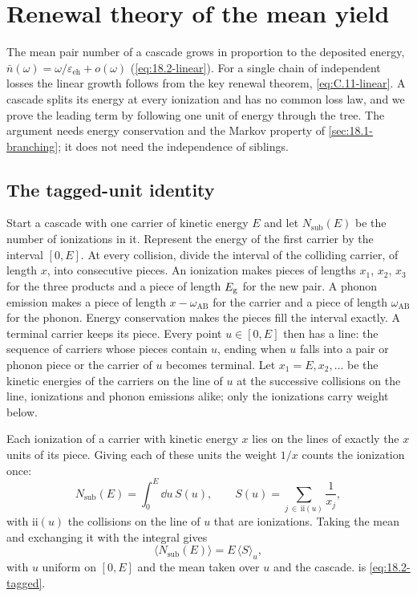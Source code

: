 \section{Renewal theory of the mean yield}\label{app:D.44}

The mean pair number of a cascade grows in proportion to the deposited energy, $\bar n(\omega) = \omega/\varepsilon_{\mathrm{eh}} + o(\omega)$ (\cref{eq:18.2-linear}). For a single chain of independent losses the linear growth follows from the key renewal theorem, \cref{eq:C.11-linear}. A cascade splits its energy at every ionization and has no common loss law, and we prove the leading term by following one unit of energy through the tree. The argument needs energy conservation and the Markov property of \cref{sec:18.1-branching}; it does not need the independence of siblings.

\subsection{The tagged-unit identity}

Start a cascade with one carrier of kinetic energy $E$ and let $N_{\mathrm{sub}}(E)$ be the number of ionizations in it. Represent the energy of the first carrier by the interval $[0, E]$. At every collision, divide the interval of the colliding carrier, of length $x$, into consecutive pieces. An ionization makes pieces of lengths $x_1$, $x_2$, $x_3$ for the three products and a piece of length $E_{\mathrm{g}}$ for the new pair. A phonon emission makes a piece of length $x - \omega_{\mathrm{AB}}$ for the carrier and a piece of length $\omega_{\mathrm{AB}}$ for the phonon. Energy conservation makes the pieces fill the interval exactly. A terminal carrier keeps its piece. Every point $u \in [0, E]$ then has a line: the sequence of carriers whose pieces contain $u$, ending when $u$ falls into a pair or phonon piece or the carrier of $u$ becomes terminal. Let $x_1 = E, x_2, \dots$ be the kinetic energies of the carriers on the line of $u$ at the successive collisions on the line, ionizations and phonon emissions alike; only the ionizations carry weight below.

Each ionization of a carrier with kinetic energy $x$ lies on the lines of exactly the $x$ units of its piece. Giving each of these units the weight $1/x$ counts the ionization once:
\begin{equation*}
  N_{\mathrm{sub}}(E) = \int_0^E\dd u\,S(u) , \qquad
  S(u) = \sum_{j\,\in\,\mathrm{ii}(u)}\frac{1}{x_j} ,
\end{equation*}
with $\mathrm{ii}(u)$ the collisions on the line of $u$ that are ionizations. Taking the mean and exchanging it with the integral gives
\begin{equation}
  \langle N_{\mathrm{sub}}(E)\rangle = E\,\langle S\rangle_u ,
  \label{eq:D.44-tagged}
\end{equation}
with $u$ uniform on $[0, E]$ and the mean taken over $u$ and the cascade.  is \cref{eq:18.2-tagged}.

